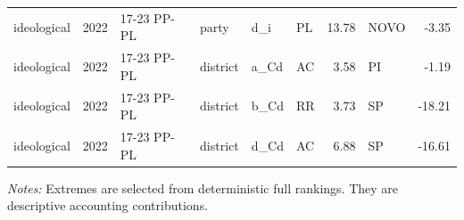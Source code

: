 \begin{landscape}
\begin{longtable}{lllL{2.2cm}lL{3.0cm}rL{3.0cm}r}
ideological & 2022 & 17-23 PP-PL & party & d\_i & PL & 13.78 & NOVO & -3.35 \\
ideological & 2022 & 17-23 PP-PL & district & a\_Cd & AC & 3.58 & PI & -1.19 \\
ideological & 2022 & 17-23 PP-PL & district & b\_Cd & RR & 3.73 & SP & -18.21 \\
ideological & 2022 & 17-23 PP-PL & district & d\_Cd & AC & 6.88 & SP & -16.61 \\
\end{longtable}
\noindent\footnotesize\textit{Notes:} Extremes are selected from deterministic full rankings. They are descriptive accounting contributions.
\endgroup
\end{landscape}
